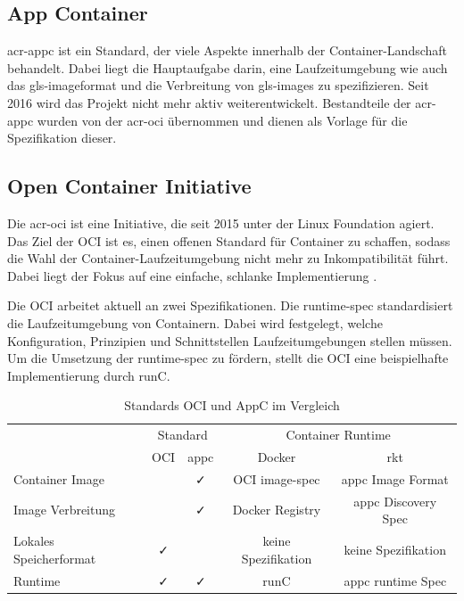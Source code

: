 \subsection{App Container}
\label{sec:appc}
\gls{acr-appc} ist ein Standard, der viele Aspekte innerhalb der Container-Landschaft behandelt. Dabei liegt die Hauptaufgabe darin, eine Laufzeitumgebung wie auch das \gls{gls-image}format und die Verbreitung von \glspl{gls-image} zu spezifizieren. Seit 2016 wird das Projekt nicht mehr aktiv weiterentwickelt. Bestandteile der \gls{acr-appc} wurden von der \gls{acr-oci} übernommen und dienen als Vorlage für die Spezifikation dieser.

\subsection{Open Container Initiative}
\label{sec:oci}
Die \gls{acr-oci} ist eine Initiative, die seit 2015 unter der Linux Foundation agiert. Das Ziel der OCI ist es, einen offenen Standard für Container zu schaffen, sodass die Wahl der Container-Laufzeitumgebung nicht mehr zu Inkompatibilität führt. Dabei liegt der Fokus auf eine einfache, schlanke Implementierung \citep{OpenContainerInitiative}.

Die OCI arbeitet aktuell an zwei Spezifikationen. Die runtime-spec standardisiert die Laufzeitumgebung  von Containern. Dabei wird festgelegt, welche Konfiguration, Prinzipien und Schnittstellen Laufzeitumgebungen stellen müssen. Um die Umsetzung der runtime-spec zu fördern, stellt die OCI eine beispielhafte Implementierung durch runC.

\begin{table}[h]
	\begin{center}
		\begin{tabular}{lcccc}
			\toprule
			& \multicolumn{2}{c}{Standard} & \multicolumn{2}{c}{Container Runtime}\\
			\cmidrule{2-5}
			& OCI		& appc		& Docker			& rkt					\\
			\midrule
			Container Image			& \faTimes	& \faCheck	& OCI image-spec 	& appc Image Format		\\
			Image Verbreitung		& \faTimes	& \faCheck	& Docker Registry	& appc Discovery Spec 	\\
			Lokales Speicherformat	& \faCheck	& \faTimes	& keine Spezifikation& keine Spezifikation	\\
			\midrule
			Runtime					& \faCheck	& \faCheck	& runC 				& appc runtime Spec		\\
			\bottomrule
		\end{tabular}
		\caption{Standards OCI und AppC im Vergleich \citep{MakingSenseofContainerStandardsandFoundations:OCICNCFAppcandRkt}}
		\label{tab:ociVSappc}
	\end{center}
\end{table}

